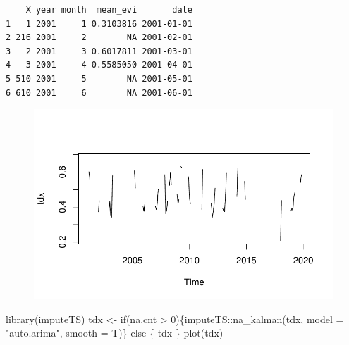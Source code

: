 \documentclass[
  letterpaper,
  DIV=11,
  numbers=noendperiod]{scrartcl}
\newenvironment{Shaded}{\begin{snugshade}}{\end{snugshade}}
\newcommand{\AttributeTok}[1]{\textcolor[rgb]{0.40,0.45,0.13}{#1}}
\newcommand{\CommentTok}[1]{\textcolor[rgb]{0.37,0.37,0.37}{#1}}
\newcommand{\ControlFlowTok}[1]{\textcolor[rgb]{0.00,0.23,0.31}{#1}}
\newcommand{\DecValTok}[1]{\textcolor[rgb]{0.68,0.00,0.00}{#1}}
\newcommand{\FunctionTok}[1]{\textcolor[rgb]{0.28,0.35,0.67}{#1}}
\newcommand{\NormalTok}[1]{\textcolor[rgb]{0.00,0.23,0.31}{#1}}
\newcommand{\OtherTok}[1]{\textcolor[rgb]{0.00,0.23,0.31}{#1}}
\newcommand{\SpecialCharTok}[1]{\textcolor[rgb]{0.37,0.37,0.37}{#1}}
\newcommand{\StringTok}[1]{\textcolor[rgb]{0.13,0.47,0.30}{#1}}
\begin{document}
\begin{verbatim}
    X year month  mean_evi       date
1   1 2001     1 0.3103816 2001-01-01
2 216 2001     2        NA 2001-02-01
3   2 2001     3 0.6017811 2001-03-01
4   3 2001     4 0.5585050 2001-04-01
5 510 2001     5        NA 2001-05-01
6 610 2001     6        NA 2001-06-01
\end{verbatim}

\begin{Shaded}
\end{Shaded}

\begin{figure}[H]

{\centering \includegraphics{Quarto_files/figure-pdf/unnamed-chunk-12-1.pdf}

}

\end{figure}

\begin{Shaded}
\begin{Highlighting}[]
\FunctionTok{library}\NormalTok{(imputeTS)}
\NormalTok{tdx }\OtherTok{\textless{}{-}} \ControlFlowTok{if}\NormalTok{(na.cnt }\SpecialCharTok{\textgreater{}} \DecValTok{0}\NormalTok{)\{imputeTS}\SpecialCharTok{::}\FunctionTok{na\_kalman}\NormalTok{(tdx, }\AttributeTok{model =} \StringTok{"auto.arima"}\NormalTok{, }\AttributeTok{smooth =}\NormalTok{ T)\} }\ControlFlowTok{else}\NormalTok{ \{}
\NormalTok{    tdx}
\NormalTok{\}}
\FunctionTok{plot}\NormalTok{(tdx)}
\end{Highlighting}
\end{Shaded}
\end{document}
